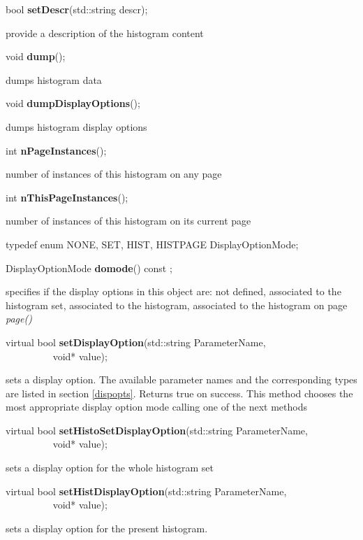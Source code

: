 \item    bool {\bf setDescr}(std::string descr);


 provide a  description of the histogram content 


\item    void {\bf dump}();


 dumps histogram data


\item    void {\bf dumpDisplayOptions}();


 dumps histogram display options


\item    int {\bf nPageInstances}();


 number of instances of this histogram on any page


\item    int {\bf nThisPageInstances}();


 number of instances of this histogram on its current page


\item   typedef enum { NONE, SET, HIST, HISTPAGE } DisplayOptionMode;
\item    DisplayOptionMode {\bf domode}() const ;

 specifies if the display options in this object are: not defined,
 associated to the histogram set, associated to the histogram,
 associated to the histogram on  page {\it page()}


\item    virtual bool {\bf setDisplayOption}(std::string ParameterName,\\\mbox{}~~~~~~~~~ 
				void* value);

 sets a display option.  The available parameter names and the corresponding types are listed 
 in section \ref{dispopts}. Returns true on success.
 This method chooses the most appropriate display option mode calling one of the next methods  


\item    virtual bool {\bf setHistoSetDisplayOption}(std::string ParameterName,\\\mbox{}~~~~~~~~~ 
					void* value);

 sets a display option for the whole histogram set


\item    virtual bool {\bf setHistDisplayOption}(std::string ParameterName,\\\mbox{}~~~~~~~~~ 
				void* value);

 sets a display option for the present histogram.


